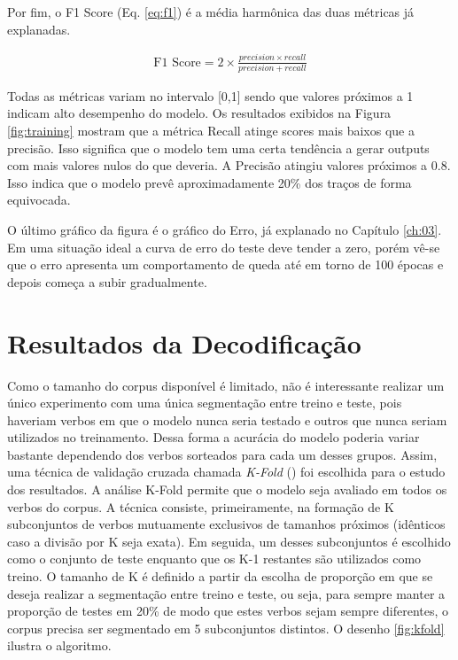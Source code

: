 Por fim, o F1 Score (Eq. \ref{eq:f1}) é a média harmônica das duas métricas já explanadas.

\begin{center}
\begin{align}\label{eq:f1}
  \text{F1 Score} = 2 \times \frac{precision \times recall}{precision + recall}
  \end{align}
\end{center}

Todas as métricas variam no intervalo [0,1] sendo que valores próximos a 1 indicam alto desempenho do modelo.
Os resultados exibidos na Figura \ref{fig:training} mostram que a métrica Recall atinge scores mais baixos que a precisão. Isso significa que o modelo tem uma certa tendência a gerar outputs com mais valores nulos do que deveria. A Precisão atingiu valores próximos a 0.8. Isso indica que o modelo prevê aproximadamente 20\% dos traços de forma equivocada.

O último gráfico da figura é o gráfico do Erro, já explanado no Capítulo \ref{ch:03}. Em uma situação ideal a curva de erro do teste deve tender a zero, porém vê-se que o erro apresenta um comportamento de queda até em torno de 100 épocas e depois começa a subir gradualmente. 



\section{Resultados da Decodificação}
\label{sec:results}
Como o tamanho do corpus disponível é limitado, não é interessante realizar um único experimento com uma única segmentação entre treino e teste, pois haveriam verbos em que o modelo nunca seria testado e outros que nunca seriam utilizados no treinamento. Dessa forma a acurácia do modelo poderia variar bastante dependendo dos verbos sorteados para cada um desses grupos. Assim, uma técnica de validação cruzada chamada \textit{K-Fold} (\cite{kfold:2018}) foi escolhida para o estudo dos resultados. A análise K-Fold permite que o modelo seja avaliado em todos os verbos do corpus. A técnica consiste, primeiramente, na formação de K subconjuntos de verbos mutuamente exclusivos de tamanhos próximos (idênticos caso a divisão por K seja exata). Em seguida, um desses subconjuntos é escolhido como o conjunto de teste enquanto que os K-1 restantes são utilizados como treino. O tamanho de K é definido a partir da escolha de proporção em que se deseja realizar a segmentação entre treino e teste, ou seja, para sempre manter a proporção de testes em 20\% de modo que estes verbos sejam sempre diferentes, o corpus precisa ser segmentado em 5 subconjuntos distintos. O desenho \ref{fig:kfold} ilustra o algoritmo. 

